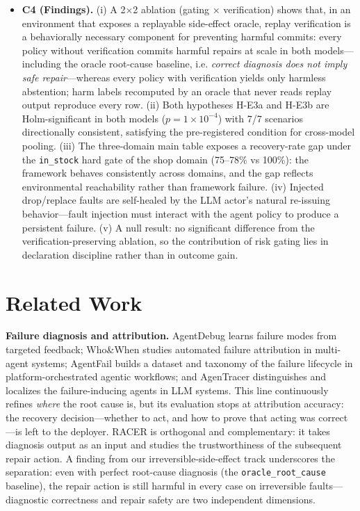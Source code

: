 \documentclass[review]{fcs}
\begin{document}
\begin{itemize}
  \item \textbf{C4 (Findings).} (i) A 2$\times$2 ablation (gating $\times$ verification) shows that, in an environment that exposes a replayable side-effect oracle, replay verification is a behaviorally necessary component for preventing harmful commits: every policy without verification commits harmful repairs at scale in both models---including the oracle root-cause baseline, i.e. \emph{correct diagnosis does not imply safe repair}---whereas every policy with verification yields only harmless abstention; harm labels recomputed by an oracle that never reads replay output reproduce every row. (ii) Both hypotheses H-E3a and H-E3b are Holm-significant in both models ($p = 1\times10^{-4}$) with 7/7 scenarios directionally consistent, satisfying the pre-registered condition for cross-model pooling. (iii) The three-domain main table exposes a recovery-rate gap under the \texttt{in\_stock} hard gate of the shop domain (75--78\% vs 100\%): the framework behaves consistently across domains, and the gap reflects environmental reachability rather than framework failure. (iv) Injected drop/replace faults are self-healed by the LLM actor's natural re-issuing behavior---fault injection must interact with the agent policy to produce a persistent failure. (v) A null result: no significant difference from the verification-preserving ablation, so the contribution of risk gating lies in declaration discipline rather than in outcome gain.

\end{itemize}

\section{Related Work}

\textbf{Failure diagnosis and attribution.} AgentDebug \cite{ref1} learns failure modes from targeted feedback; Who\&When \cite{ref2} studies automated failure attribution in multi-agent systems; AgentFail \cite{ref3} builds a dataset and taxonomy of the failure lifecycle in platform-orchestrated agentic workflows; and AgenTracer \cite{ref4} distinguishes and localizes the failure-inducing agents in LLM systems. This line continuously refines \emph{where} the root cause is, but its evaluation stops at attribution accuracy: the recovery decision---whether to act, and how to prove that acting was correct---is left to the deployer. RACER is orthogonal and complementary: it takes diagnosis output as an input and studies the trustworthiness of the subsequent repair action. A finding from our irreversible-side-effect track underscores the separation: even with perfect root-cause diagnosis (the \texttt{oracle\_root\_cause} baseline), the repair action is still harmful in every case on irreversible faults---diagnostic correctness and repair safety are two independent dimensions.
\end{document}
